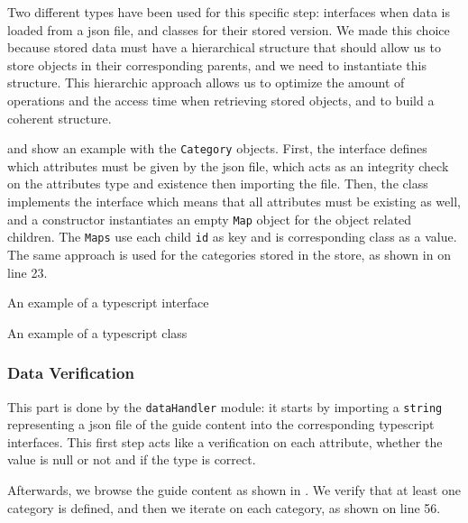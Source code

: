 Two different types have been used for this specific step: interfaces when data is loaded from a \gls{json} file, and classes for their stored version. We made this choice because stored data must have a hierarchical structure that should allow us to store objects in their corresponding parents, and we need to instantiate this structure. This hierarchic approach allows us to optimize the amount of operations and the access time when retrieving stored objects, and to build a coherent structure. 

 and  show an example with the \texttt{Category} objects. First, the interface defines which attributes must be given by the \gls{json} file, which acts as an integrity check on the attributes type and existence then importing the file. Then, the class implements the interface which means that all attributes must be existing as well, and a constructor instantiates an empty \texttt{Map} object for the object related children. The \texttt{Maps} use each child \texttt{id} as key and is corresponding class as a value. The same approach is used for the categories stored in the store, as shown in  on line 23.

\begin{listing}[!ht] 
	\caption{An example of a \gls*{typescript} interface}
	\label{lst:app_implementation_store_interface}
\end{listing}
\begin{listing}[!ht] 
	\caption{An example of a \gls*{typescript} class}
	\label{lst:app_implementation_store_class}
\end{listing}

\subsubsection{Data Verification}
\label{subsubsec:app_implementation_features_store_verification}

This part is done by the \texttt{dataHandler} module: it starts by importing a \texttt{string} representing a \gls{json} file of the guide content into the corresponding \gls{typescript} interfaces. This first step acts like a verification on each attribute, whether the value is null or not and if the type is correct.

Afterwards, we browse the guide content as shown in . We verify that at least one category is defined, and then we iterate on each category, as shown on line 56.


